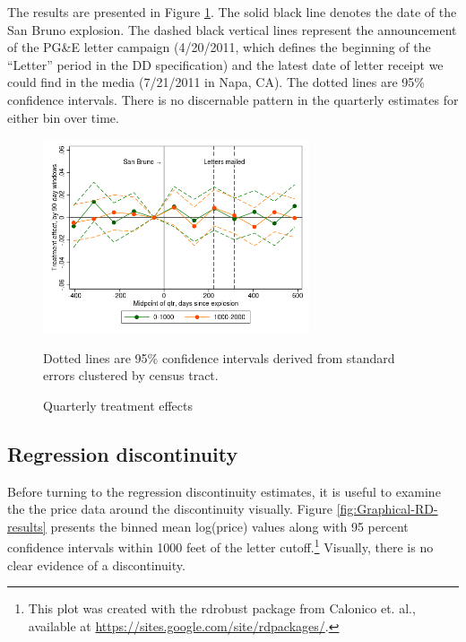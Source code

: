 \documentclass[12pt]{article}
\begin{document}
The results are presented in Figure \ref{fig:Quarterly-treatment-effects}.
The solid black line denotes the date of the San Bruno explosion.
The dashed black vertical lines represent the announcement of the
PG\&E letter campaign (4/20/2011, which defines the beginning of the
``Letter'' period in the DD specification) and the latest date of
letter receipt we could find in the media (7/21/2011 in Napa, CA).
The dotted lines are 95\% confidence intervals. There is no discernable
pattern in the quarterly estimates for either bin over time.
\begin{center}
\begin{figure}[H]
\begin{centering}
\caption{Quarterly treatment effects \label{fig:Quarterly-treatment-effects}}
\includegraphics[width=0.7\textwidth]{../output/PGE_xs_qtr_TrQtr}
\par\end{centering}
\centering \scriptsize Dotted lines are 95\% confidence intervals
derived from standard errors clustered by census tract.
\end{figure}
\par\end{center}

\subsection{Regression discontinuity}

Before turning to the regression discontinuity estimates, it is useful
to examine the the price data around the discontinuity visually. Figure
\ref{fig:Graphical-RD-results} presents the binned mean log(price)
values along with 95 percent confidence intervals within 1000 feet
of the letter cutoff.\footnote{This plot was created with the rdrobust package from Calonico et.
al., available at \href{https://sites.google.com/site/rdpackages/}{https://sites.google.com/site/rdpackages/}.} Visually, there is no clear evidence of a discontinuity. 
\end{document}

